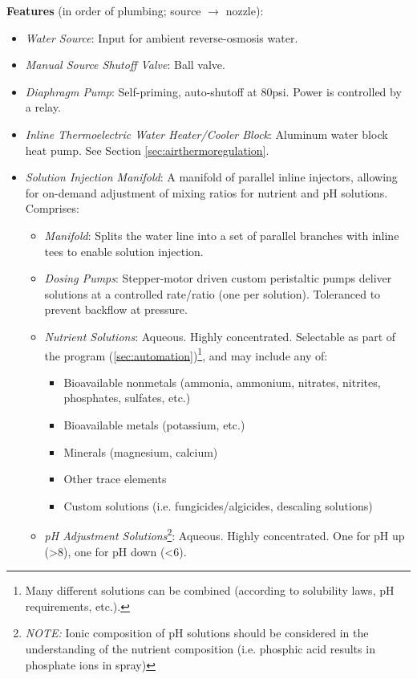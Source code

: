 \textbf{Features} (in order of plumbing; source $\to$ nozzle):
\begin{itemize}
    \item \textit{Water Source}: Input for ambient reverse-osmosis water.
    \item \textit{Manual Source Shutoff Valve}: Ball valve.
    \item \textit{Diaphragm Pump}: Self-priming, auto-shutoff at 80psi. Power is controlled by a relay.
    \item \textit{Inline Thermoelectric Water Heater/Cooler Block}: Aluminum water block heat pump. See Section \ref{sec:airthermoregulation}.
    \item \textit{Solution Injection Manifold}: A manifold of parallel inline injectors, allowing for on-demand adjustment of mixing ratios for nutrient and pH solutions. Comprises:
    \begin{itemize}
        \item \textit{Manifold}: Splits the water line into a set of parallel branches with inline tees to enable solution injection.
        \item \textit{Dosing Pumps}: Stepper-motor driven custom peristaltic pumps deliver solutions at a controlled rate/ratio (one per solution). Toleranced to prevent backflow at pressure. %
        \item \textit{Nutrient Solutions}: Aqueous. Highly concentrated. Selectable as part of the program (\ref{sec:automation})\footnote{Many different solutions can be combined (according to solubility laws, pH requirements, etc.).}, and may include any of:
        \begin{itemize}
            \item Bioavailable nonmetals (ammonia, ammonium, nitrates, nitrites, phosphates, sulfates, etc.)
            \item Bioavailable metals (potassium, etc.)
            \item Minerals (magnesium, calcium)
            \item Other trace elements
            \item Custom solutions (i.e. fungicides/algicides, descaling solutions)
        \end{itemize} 
        \item \textit{pH Adjustment Solutions}\footnote{\textit{NOTE:} Ionic composition of pH solutions should be considered in the understanding of the nutrient composition (i.e. phosphic acid results in phosphate ions in spray)}: Aqueous. Highly concentrated. One for pH up (>8), one for pH down (<6).

\end{itemize}
\end{itemize}
